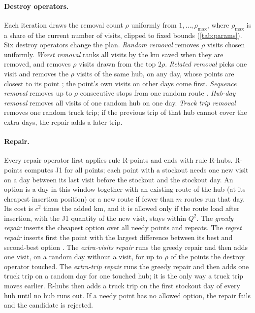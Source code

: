 \documentclass[11pt,a4paper]{article}
\begin{document}
\paragraph{Destroy operators.}
Each iteration draws the removal count $\rho$ uniformly from $1,\dots,\rho_{\max}$, where
$\rho_{\max}$ is a share of the current number of visits, clipped to fixed bounds
(\cref{tab:params}). Six destroy operators change the plan. \emph{Random removal} removes $\rho$
visits chosen uniformly. \emph{Worst removal} ranks all visits by the km saved when they are
removed, and removes $\rho$ visits drawn from the top $2\rho$. \emph{Related removal} picks one
visit and removes the $\rho$ visits of the same hub, on any day, whose points are closest to its
point \citep{shaw1998using}; the point's own visits on other days come first. \emph{Sequence
removal} removes up to $\rho$ consecutive stops from one random route \citep{voigt2025review}.
\emph{Hub-day removal} removes all visits of one random hub on one day. \emph{Truck trip removal}
removes one random truck trip; if the previous trip of that hub cannot cover the extra days, the
repair adds a later trip.

\paragraph{Repair.}
Every repair operator first applies rule R-points and ends with rule R-hubs. R-points computes J1
for all points; each point with a stockout needs one new visit on a day between its last visit
before the stockout and the stockout day. An option is a day in this window together with an
existing route of the hub (at its cheapest insertion position) or a new route if fewer than $m$
routes run that day. Its cost is $c^2$ times the added km, and it is allowed only if the route
load after insertion, with the J1 quantity of the new visit, stays within $Q^2$. The \emph{greedy
repair} inserts the cheapest option over all needy points and repeats. The \emph{regret repair}
inserts first the point with the largest difference between its best and second-best option
\citep{ropke2006adaptive}. The \emph{extra-visits repair} runs the greedy repair and then adds one
visit, on a random day without a visit, for up to $\rho$ of the points the destroy operator
touched. The \emph{extra-trip repair} runs the greedy repair and then adds one truck trip on a
random day for one touched hub; it is the only way a truck trip moves earlier. R-hubs then adds a
truck trip on the first stockout day of every hub until no hub runs out. If a needy point has no
allowed option, the repair fails and the candidate is rejected.
\end{document}
